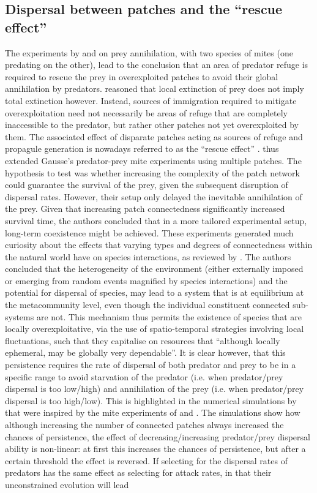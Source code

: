 \documentclass[a4paper]{report}
\begin{document}
\subsection{Dispersal between patches and the “rescue effect” \label{sec:Dispersal}} The experiments by \citep{gausse1934} and \citep{Gause1936} on prey annihilation, with two species of mites (one predating on the other), lead to the conclusion that an area of predator refuge is required to rescue the prey in overexploited patches to avoid their global annihilation by predators.\citep{HuffakerC.} reasoned that local extinction of prey does not imply total extinction however. Instead, sources of immigration required to mitigate overexploitation need not necessarily be areas of refuge that are completely inaccessible to the predator, but rather other patches not yet overexploited by them. The associated effect of disparate patches acting as sources of refuge and propagule generation is nowadays referred to as the “rescue effect” \citep{Utherland2012}. \citep{HuffakerC.} thus extended Gausse's predator-prey mite experiments using multiple patches. The hypothesis to test was whether increasing the complexity of the patch network could guarantee the survival of the prey, given the subsequent disruption of dispersal rates. However, their setup only delayed the inevitable annihilation of the prey. Given that increasing patch connectedness significantly increased survival time, the authors concluded that in a more tailored experimental setup, long-term coexistence might be achieved. These experiments generated much curiosity about the effects that varying types and degrees of connectedness within the natural world have on species interactions, as reviewed by \citep{Levin1976}. The authors concluded that the heterogeneity of the environment (either externally imposed or emerging from random events magnified by species interactions) and the potential for dispersal of species, may lead to a system that is at equilibrium at the metacommunity level, even though the individual constituent connected sub-systems are not. This mechanism thus permits the existence of species that are locally overexploitative, via the use of spatio-temporal strategies involving local fluctuations, such that they capitalise on resources that “although locally ephemeral, may be globally very dependable”. It is clear however, that this persistence requires the rate of dispersal of both predator and prey to be in a specific range to avoid starvation of the predator (i.e. when predator/prey dispersal is too low/high) and annihilation of the prey (i.e. when predator/prey dispersal is too high/low). This is highlighted in the numerical simulations by \citep{Hilborn1975} that were inspired by the mite experiments of \citep{HuffakerC.} and \citep{Hastings1977}. The simulations show how although increasing the number of connected patches always increased the chances of persistence, the effect of decreasing/increasing predator/prey dispersal ability is non-linear: at first this increases the chances of persistence, but after a certain threshold the effect is reversed. If selecting for the dispersal rates of predators has the same effect as selecting for attack rates, in that their unconstrained evolution will lead 
\end{document}
